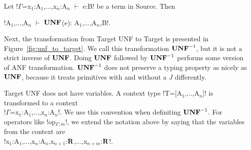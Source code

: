 \begin{lemma}
    Let !$\Gamma$=x$_1$:A$_{1}$,$\ldots$,x$_n$:A$_{n}$ $\vdash$ e:B! be a term in Source. Then
    \begin{center}
        !A$_{1}$,$\ldots$,A$_{n}$ $\vdash$ $\mathbf{UNF}$(e): A$_{1}$,$\ldots$,A$_{n}$,B!.
    \end{center}
\end{lemma}




Next, the transformation from Target UNF to Target is presented in Figure~\ref{fig:unf_to_target}. 
We call this transformation $\mathbf{UNF}^{-1}$, but it is not a strict inverse of $\mathbf{UNF}$.
Doing $\mathbf{UNF}$ followed by $\mathbf{UNF}^{-1}$ performs some version of ANF transformation. 
$\mathbf{UNF}^{-1}$ does not preserve a typing property as nicely as $\mathbf{UNF}$, 
because it treats primitives with and without a $J$ differently.

Target UNF does not have variables. 
A context type !T=[A$_1$,$\ldots$,A$_n$]! is transformed to a context \\
!$\Gamma$=x$_1$:A$_1$,$\ldots$,x$_n$:A$_n$!.
We use this convention when definiting $\mathbf{UNF}^{-1}$. 
For operators like !op$_{\Gamma;m}$!, we extend the notation above by saying that the variables from the context are \\
!x$_1$:A$_1$,$\ldots$,x$_n$:A$_n$,x$_{n+1}$:$\mathbf{R}$,$\ldots$,x$_{n+m}$:$\mathbf{R}$!.


